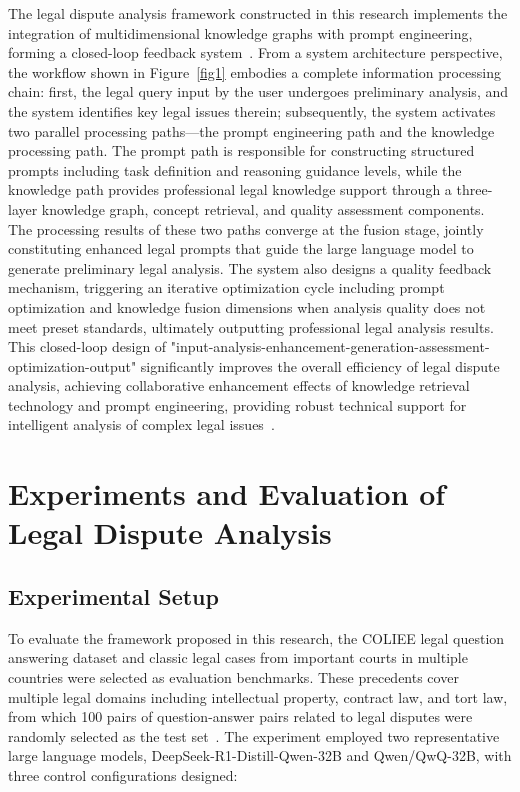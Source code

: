 \documentclass{article}
\theoremstyle{plain}
\theoremstyle{definition}
\begin{document}
The legal dispute analysis framework constructed in this research implements the integration of multidimensional knowledge graphs with prompt engineering, forming a closed-loop feedback system~\cite{Sun2023}. From a system architecture perspective, the workflow shown in Figure~\ref{fig1} embodies a complete information processing chain: first, the legal query input by the user undergoes preliminary analysis, and the system identifies key legal issues therein; subsequently, the system activates two parallel processing paths—the prompt engineering path and the knowledge processing path. The prompt path is responsible for constructing structured prompts including task definition and reasoning guidance levels, while the knowledge path provides professional legal knowledge support through a three-layer knowledge graph, concept retrieval, and quality assessment components. The processing results of these two paths converge at the fusion stage, jointly constituting enhanced legal prompts that guide the large language model to generate preliminary legal analysis. The system also designs a quality feedback mechanism, triggering an iterative optimization cycle including prompt optimization and knowledge fusion dimensions when analysis quality does not meet preset standards, ultimately outputting professional legal analysis results. This closed-loop design of "input-analysis-enhancement-generation-assessment-optimization-output" significantly improves the overall efficiency of legal dispute analysis, achieving collaborative enhancement effects of knowledge retrieval technology and prompt engineering, providing robust technical support for intelligent analysis of complex legal issues~\cite{Cui2023}.

\FloatBarrier
\section{Experiments and Evaluation of Legal Dispute Analysis}
\label{sec4}

\subsection{Experimental Setup}
\label{sec4.1}

To evaluate the framework proposed in this research, the COLIEE legal question answering dataset and classic legal cases from important courts in multiple countries were selected as evaluation benchmarks. These precedents cover multiple legal domains including intellectual property, contract law, and tort law, from which 100 pairs of question-answer pairs related to legal disputes were randomly selected as the test set~\cite{Chalkidis2022}. The experiment employed two representative large language models, DeepSeek-R1-Distill-Qwen-32B and Qwen/QwQ-32B, with three control configurations designed:
\end{document}
